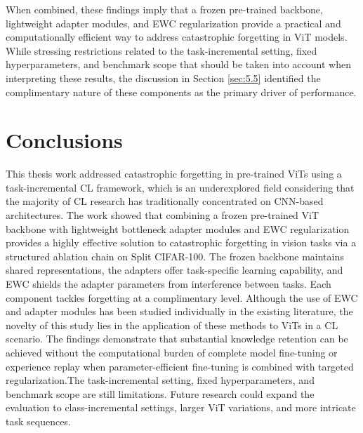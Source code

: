 \documentclass[english, LaM, oneside]{sapthesis}%
\numberwithin{equation}{chapter}
\begin{document}
When combined, these findings imply that a frozen pre-trained backbone, lightweight adapter modules, and EWC regularization provide a practical and computationally efficient way to address catastrophic forgetting in ViT models. While stressing restrictions related to the task-incremental setting, fixed hyperparameters, and benchmark scope that should be taken into account when interpreting these results, the discussion in Section \ref{sec:5.5} identified the complimentary nature of these components as the primary driver of performance.

\chapter{Conclusions}
\label{chap:6}
This thesis work addressed catastrophic forgetting in pre-trained ViTs using a task-incremental CL framework, which is an underexplored field considering that the majority of CL research has traditionally concentrated on CNN-based architectures. The work showed that combining a frozen pre-trained ViT backbone with lightweight bottleneck adapter modules and EWC regularization provides a highly effective solution to catastrophic forgetting in vision tasks via a structured ablation chain on Split CIFAR-100. The frozen backbone maintains shared representations, the adapters offer task-specific learning capability, and EWC shields the adapter parameters from interference between tasks. Each component tackles forgetting at a complimentary level. Although the use of EWC and adapter modules has been studied individually in the existing literature, the novelty of this study lies in the application of these methods to ViTs in a CL scenario.  The findings demonstrate that substantial knowledge retention can be achieved without the computational burden of complete model fine-tuning or experience replay when parameter-efficient fine-tuning is combined with targeted regularization.The task-incremental setting, fixed hyperparameters, and benchmark scope are still limitations. Future research could expand the evaluation to class-incremental settings, larger ViT variations, and more intricate task sequences.

\backmatter
{}



\end{document}
